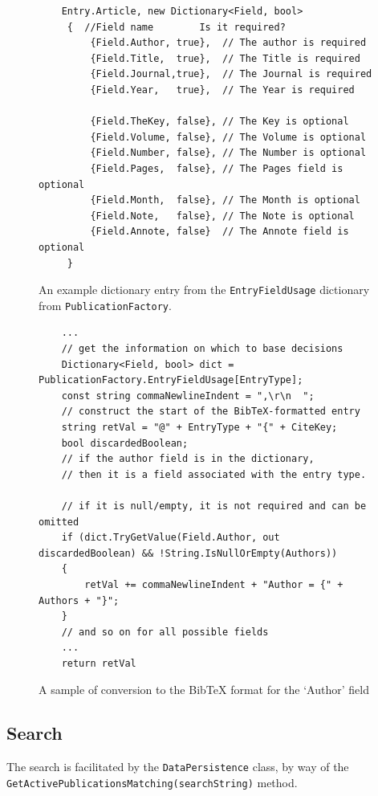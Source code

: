 \begin{figure}
	\begin{center}
			\lstset{language=CSharp} 
			\begin{lstlisting}
	Entry.Article, new Dictionary<Field, bool>
	 {	//Field name		Is it required?
	     {Field.Author, true}, 	// The author is required
	     {Field.Title, 	true},	// The Title is required
	     {Field.Journal,true},	// The Journal is required
	     {Field.Year, 	true},	// The Year is required

	     {Field.TheKey, false},	// The Key is optional
	     {Field.Volume, false},	// The Volume is optional
	     {Field.Number, false},	// The Number is optional
	     {Field.Pages, 	false},	// The Pages field is optional
	     {Field.Month, 	false},	// The Month is optional
	     {Field.Note, 	false},	// The Note is optional
	     {Field.Annote, false}	// The Annote field is optional
	 }
  		\end{lstlisting}
		\caption{An example dictionary entry from the \texttt{EntryFieldUsage} dictionary from \texttt{PublicationFactory}.}
		\label{fig:EntryFieldUsage}
	\end{center}
\end{figure}
\begin{figure}
	\begin{center}
			\lstset{language=CSharp} 
			\begin{lstlisting}
	...
	// get the information on which to base decisions
	Dictionary<Field, bool> dict = PublicationFactory.EntryFieldUsage[EntryType];
	const string commaNewlineIndent = ",\r\n  ";
	// construct the start of the BibTeX-formatted entry
	string retVal = "@" + EntryType + "{" + CiteKey;
	bool discardedBoolean;
	// if the author field is in the dictionary, 
	// then it is a field associated with the entry type.  
	
	// if it is null/empty, it is not required and can be omitted
	if (dict.TryGetValue(Field.Author, out discardedBoolean) && !String.IsNullOrEmpty(Authors))
	{
	    retVal += commaNewlineIndent + "Author = {" + Authors + "}";
	}
	// and so on for all possible fields
	... 
	return retVal
  		\end{lstlisting}
		\caption{A sample of conversion to the BibTeX format for the `Author' field}
		\label{fig:BibFileConversion}
	\end{center}
\end{figure}



\subsection{Search}
\label{searchCore}
The search is facilitated by the \texttt{DataPersistence} class, by way of the\\ \texttt{GetActivePublicationsMatching(searchString)} method.  

